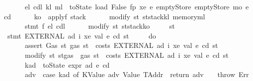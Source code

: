 \begin{isabellebody}
\ \ \ \ \ \ {\isacharparenleft}{\kern0pt}e\isactrlsub l{\isacharcomma}{\kern0pt}\ cd\isactrlsub l{\isacharcomma}{\kern0pt}\ k\isactrlsub l{\isacharcomma}{\kern0pt}\ m\isactrlsub l{\isacharparenright}{\kern0pt}\ {\isasymleftarrow}\ toState\ {\isacharparenleft}{\kern0pt}load\ False\ fp\ xe\ e{\isacharprime}{\kern0pt}\ emptyStore\ emptyStore\ m\isactrlsub o\ e\ cd{\isacharparenright}{\kern0pt}{\isacharsemicolon}{\kern0pt}\isanewline
\ \ \ \ \ \ k\isactrlsub o\ {\isasymleftarrow}\ applyf\ stack{\isacharsemicolon}{\kern0pt}\isanewline
\ \ \ \ \ \ modify\ {\isacharparenleft}{\kern0pt}{\isasymlambda}st{\isachardot}{\kern0pt}\ st{\isasymlparr}stack{\isacharcolon}{\kern0pt}{\isacharequal}{\kern0pt}k\isactrlsub l{\isacharcomma}{\kern0pt}\ memory{\isacharcolon}{\kern0pt}{\isacharequal}{\kern0pt}m\isactrlsub l{\isasymrparr}{\isacharparenright}{\kern0pt}{\isacharsemicolon}{\kern0pt}\isanewline
\ \ \ \ \ \ stmt\ f\ e\isactrlsub l\ cd\isactrlsub l{\isacharsemicolon}{\kern0pt}\isanewline
\ \ \ \ \ \ modify\ {\isacharparenleft}{\kern0pt}{\isasymlambda}st{\isachardot}{\kern0pt}\ st{\isasymlparr}stack{\isacharcolon}{\kern0pt}{\isacharequal}{\kern0pt}k\isactrlsub o{\isasymrparr}{\isacharparenright}{\kern0pt}\isanewline
\ \ \ \ {\isacharbraceright}{\kern0pt}{\isacharparenright}{\kern0pt}\ st{\isachardoublequoteclose}\isanewline
\isanewline
\isanewline
\isanewline
{\isacharbar}{\kern0pt}\ {\isachardoublequoteopen}stmt\ {\isacharparenleft}{\kern0pt}EXTERNAL\ ad\ i\ xe\ val{\isacharparenright}{\kern0pt}\ e\ cd\ st\ {\isacharequal}{\kern0pt}\isanewline
\ \ \ \ {\isacharparenleft}{\kern0pt}do\ {\isacharbraceleft}{\kern0pt}\isanewline
\ \ \ \ \ \ assert\ Gas\ {\isacharparenleft}{\kern0pt}{\isasymlambda}st{\isachardot}{\kern0pt}\ gas\ st\ {\isachargreater}{\kern0pt}\ costs\ {\isacharparenleft}{\kern0pt}EXTERNAL\ ad\ i\ xe\ val{\isacharparenright}{\kern0pt}\ e\ cd\ st{\isacharparenright}{\kern0pt}{\isacharsemicolon}{\kern0pt}\isanewline
\ \ \ \ \ \ modify\ {\isacharparenleft}{\kern0pt}{\isasymlambda}st{\isachardot}{\kern0pt}\ st{\isasymlparr}gas\ {\isacharcolon}{\kern0pt}{\isacharequal}{\kern0pt}\ gas\ st\ {\isacharminus}{\kern0pt}\ costs\ {\isacharparenleft}{\kern0pt}EXTERNAL\ ad\ i\ xe\ val{\isacharparenright}{\kern0pt}\ e\ cd\ st{\isasymrparr}{\isacharparenright}{\kern0pt}{\isacharsemicolon}{\kern0pt}\isanewline
\ \ \ \ \ \ kad\ {\isasymleftarrow}\ toState\ {\isacharparenleft}{\kern0pt}expr\ ad\ e\ cd{\isacharparenright}{\kern0pt}{\isacharsemicolon}{\kern0pt}\isanewline
\ \ \ \ \ \ adv\ {\isasymleftarrow}\ case\ kad\ of\ {\isacharparenleft}{\kern0pt}KValue\ adv{\isacharcomma}{\kern0pt}\ Value\ TAddr{\isacharparenright}{\kern0pt}\ {\isasymRightarrow}\ return\ adv\ {\isacharbar}{\kern0pt}\ {\isacharunderscore}{\kern0pt}\ {\isasymRightarrow}\ throw\ Err{\isacharsemicolon}{\kern0pt}\isanewline

\end{isabellebody}
